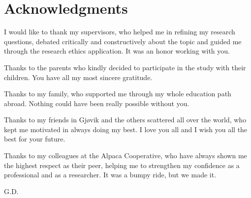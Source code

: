 \chapter*{Acknowledgments}
I would like to thank my supervisors, who helped me in refining my research questions, debated critically and constructively about the topic and guided me through the research ethics application. It was an honor working with you.

Thanks to the parents who kindly decided to participate in the study with their children. You have all my most sincere gratitude.

Thanks to my family, who supported me through my whole education path abroad. Nothing could have been really possible without you.

Thanks to my friends in Gjøvik and the others scattered all over the world, who kept me motivated in always doing my best. I love you all and I wish you all the best for your future.

Thanks to my colleagues at the Alpaca Cooperative, who have always shown me the highest respect as their peer, helping me to strengthen my confidence as a professional and as a researcher. It was a bumpy ride, but we made it.
\begin{flushright}
G.D.\\
\end{flushright}

\hypersetup{pageanchor=false}